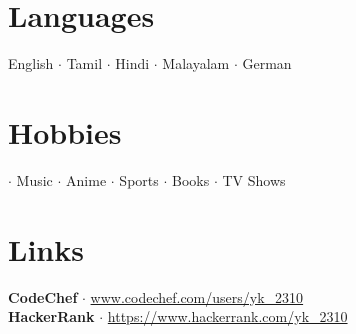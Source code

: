 \documentclass[letterpaper,12pt]{article}
\begin{document}
\section{Languages}
English $\cdot$ Tamil $\cdot$ Hindi $\cdot$ Malayalam  $\cdot$ German

\section{Hobbies}
 $\cdot$ Music $\cdot$ Anime $\cdot$ Sports $\cdot$ Books $\cdot$ TV Shows
 
 \section{Links}
 \textbf{CodeChef}
 $\cdot$ \href{https://www.codechef.com/users/yk_2310}{www.codechef.com/users/yk\_2310}\\ 
  \textbf{HackerRank}
 $\cdot$ \href{https://www.hackerrank.com/yk_2310}{https://www.hackerrank.com/yk\_2310}
\end{document}
